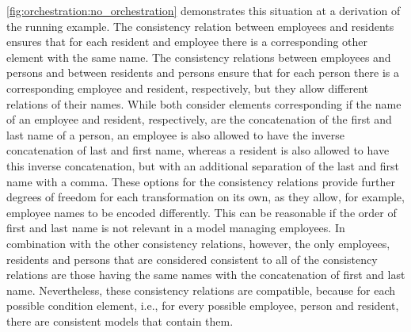 \autoref{fig:orchestration:no_orchestration} %
demonstrates this situation at a derivation of the running example.
The consistency relation between employees and residents ensures that for each resident and employee there is a corresponding other element with the same name.
The consistency relations between employees and persons and between residents and persons ensure that for each person there is a corresponding employee and resident, respectively, but they allow different relations of their names.
While both consider elements corresponding if the name of an employee and resident, respectively, are the concatenation of the first and last name of a person, an employee is also allowed to have the inverse concatenation of last and first name, whereas a resident is also allowed to have this inverse concatenation, but with an additional separation of the last and first name with a comma.
These options for the consistency relations provide further degrees of freedom for each transformation on its own, as they allow, for example, employee names to be encoded differently.
This can be reasonable if the order of first and last name is not relevant in a model managing employees.
In combination with the other consistency relations, however, the only employees, residents and persons that are considered consistent to all of the consistency relations are those having the same names with the concatenation of first and last name.
Nevertheless, these consistency relations are compatible, because for each possible condition element, i.e., for every possible employee, person and resident, there are consistent models that contain them.

